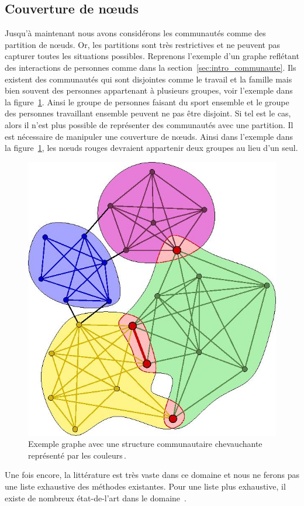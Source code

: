 
\subsection{Couverture de n\oe uds}
\label{subsec:cover}
Jusqu'à maintenant nous avons considérons les communautés comme des partition de n\oe uds.
Or, les partitions sont très restrictives et ne peuvent pas capturer toutes les situations possibles.
Reprenons l'exemple d'un graphe reflétant des interactions de personnes comme dans la section~\ref{sec:intro_communaute}.
Ils existent des communautés qui sont disjointes comme le travail et la famille mais bien souvent des personnes appartenant à plusieurs groupes, voir l'exemple dans la figure~\ref{fig:ex_overlap_communaute}.
Ainsi le groupe de personnes faisant du sport ensemble et le groupe des personnes travaillant ensemble peuvent ne pas être disjoint.
Si tel est le cas, alors il n'est plus possible de représenter des communautés avec une partition.
Il est nécessaire de manipuler une couverture de n\oe uds.
Ainsi dans l'exemple dans la figure~\ref{fig:ex_overlap_communaute}, les n\oe uds rouges devraient appartenir deux groupes au lieu d'un seul.

\begin{figure}
	\centering
	\includegraphics[width=0.31\linewidth]{img/Intro/Illustration_of_overlapping_communities.jpg}
	\caption{Exemple graphe avec une structure communautaire chevauchante représenté par les couleurs\,\protect\footnotemark.}
	\label{fig:ex_overlap_communaute}
\end{figure}

Une fois encore, la littérature est très vaste dans ce domaine et nous ne ferons pas une liste exhaustive des méthodes existantes.
Pour une liste plus exhaustive, il existe de nombreux état-de-l'art dans le domaine~\cite{Danisch2012, Kanawati2014, Xie2013,Bandyopadhyay2015, Hric2014a}.

